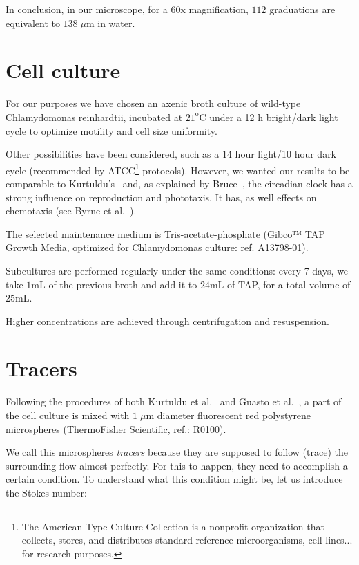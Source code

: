 In conclusion, in our microscope, for a 60x magnification, $112$ graduations are equivalent to $138 \; \mu \textrm{m}$ in water.

\section{Cell culture}

For our purposes we have chosen an axenic broth culture of wild-type Chlamydomonas reinhardtii, incubated at $21^\textrm{o} \textrm{C}$ under a 12 h bright/dark light cycle to optimize motility and cell size uniformity.

Other possibilities have been considered, such as a 14 hour light/10 hour dark cycle (recommended by ATCC\footnote{The American Type Culture Collection is a nonprofit organization that collects, stores, and distributes standard reference microorganisms, cell lines... for research purposes.} protocols). However, we wanted our results to be comparable to Kurtuldu's~\cite{Kurtuldu2011} and, as explained by Bruce~\cite{Bruce}, the circadian clock has a strong influence on reproduction and phototaxis. It has, as well effects on chemotaxis (see Byrne et al.~\cite{Byrne}).

The selected maintenance medium is Tris-acetate-phosphate (Gibco™ TAP Growth Media, optimized for Chlamydomonas culture: ref. A13798-01). 

Subcultures are performed regularly under the same conditions: every 7 days, we take $1 \textrm{mL}$ of the previous broth and add it to $24 \textrm{mL}$ of TAP, for a total volume of $25 \textrm{mL}$.

Higher concentrations are achieved through centrifugation and resuspension.

\section{Tracers}

Following the procedures of both Kurtuldu et al.~\cite{Kurtuldu2011} and Guasto et al.~\cite{Guasto}, a part of the cell culture is mixed with $1 \; \mu \textrm{m}$ diameter fluorescent red polystyrene microspheres (ThermoFisher Scientific, ref.: R0100). 

We call this microspheres \textit{tracers} because they are supposed to follow (trace) the surrounding flow almost perfectly. For this to happen, they need to accomplish a certain condition. To understand what this condition might be, let us introduce the Stokes number:

